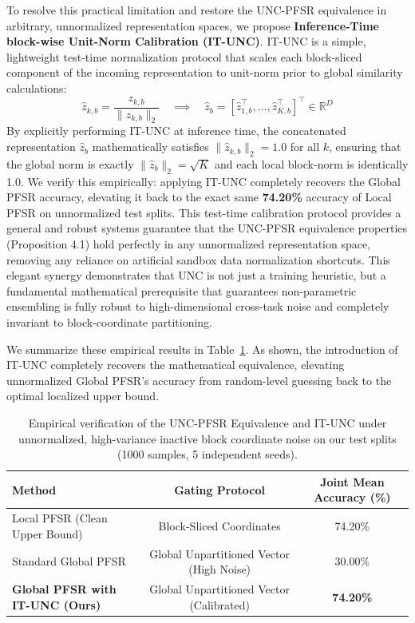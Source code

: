 \documentclass{article}
\theoremstyle{plain}
\theoremstyle{definition}
\theoremstyle{remark}
\begin{document}
To resolve this practical limitation and restore the UNC-PFSR equivalence in arbitrary, unnormalized representation spaces, we propose \textbf{Inference-Time block-wise Unit-Norm Calibration (IT-UNC)}. IT-UNC is a simple, lightweight test-time normalization protocol that scales each block-sliced component of the incoming representation to unit-norm prior to global similarity calculations:
\begin{equation}
\hat{z}_{k, b} = \frac{z_{k, b}}{\|z_{k, b}\|_2} \quad \implies \quad \hat{z}_b = [\hat{z}_{1, b}^\top, \dots, \hat{z}_{K, b}^\top]^\top \in \mathbb{R}^D
\end{equation}
By explicitly performing IT-UNC at inference time, the concatenated representation $\hat{z}_b$ mathematically satisfies $\| \hat{z}_{k, b} \|_2 = 1.0$ for all $k$, ensuring that the global norm is exactly $\| \hat{z}_b \|_2 = \sqrt{K}$ and each local block-norm is identically 1.0. We verify this empirically: applying IT-UNC completely recovers the Global PFSR accuracy, elevating it back to the exact same \textbf{74.20\%} accuracy of Local PFSR on unnormalized test splits. This test-time calibration protocol provides a general and robust systems guarantee that the UNC-PFSR equivalence properties (Proposition 4.1) hold perfectly in any unnormalized representation space, removing any reliance on artificial sandbox data normalization shortcuts. This elegant synergy demonstrates that UNC is not just a training heuristic, but a fundamental mathematical prerequisite that guarantees non-parametric ensembling is fully robust to high-dimensional cross-task noise and completely invariant to block-coordinate partitioning.

We summarize these empirical results in Table~\ref{tab:it_unc_results}. As shown, the introduction of IT-UNC completely recovers the mathematical equivalence, elevating unnormalized Global PFSR's accuracy from random-level guessing back to the optimal localized upper bound.

\begin{table}[htbp]
\centering
\caption{Empirical verification of the UNC-PFSR Equivalence and IT-UNC under unnormalized, high-variance inactive block coordinate noise on our test splits (1000 samples, 5 independent seeds).}
\label{tab:it_unc_results}
\vskip 0.15in
\begin{tabular}{lcc}
\toprule
Method & Gating Protocol & Joint Mean Accuracy (\%) \\
\midrule
Local PFSR (Clean Upper Bound) & Block-Sliced Coordinates & 74.20\% \\
Standard Global PFSR & Global Unpartitioned Vector (High Noise) & 30.00\% \\
\textbf{Global PFSR with IT-UNC (Ours)} & Global Unpartitioned Vector (Calibrated) & \textbf{74.20\%} \\
\bottomrule
\end{tabular}
\end{table}
\end{document}
